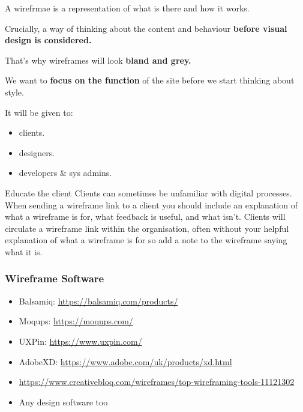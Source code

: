 A wirefrmae is a representation of what is there and how it works.

Crucially, a way of thinking about the content and behaviour \textbf{before visual design is considered.}

That’s why wireframes will look \textbf{bland and grey.}

We want to \textbf{focus on the function} of the site before we start thinking about style.

It will be given to:

\begin{itemize}
    \item clients.
    \item designers.
    \item developers \& sys admins.
\end{itemize}

\begin{infobox}{Educate the client}
    Clients can sometimes be unfamiliar with digital processes. When sending a wireframe link to a client you should include an explanation of what a wireframe is for, what feedback is useful, and what isn’t.
    Clients will circulate a wireframe link within the organisation, often without your helpful explanation of what a wireframe is for so add a note to the wireframe saying what it is.
\end{infobox}

\subsubsection{Wireframe Software}

\begin{itemize}
    \item Balsamiq: \href{https://balsamiq.com/products/}{https://balsamiq.com/products/}
    \item Moqups: \href{https://moqups.com/}{https://moqups.com/}
    \item UXPin: \href{https://www.uxpin.com/}{https://www.uxpin.com/}
    \item AdobeXD: \href{https://www.adobe.com/uk/products/xd.html}{https://www.adobe.com/uk/products/xd.html}
    \item \href{List on Creative Bloc here}{https://www.creativebloq.com/wireframes/top-wireframing-tools-11121302}
    \item Any design software too
\end{itemize}

